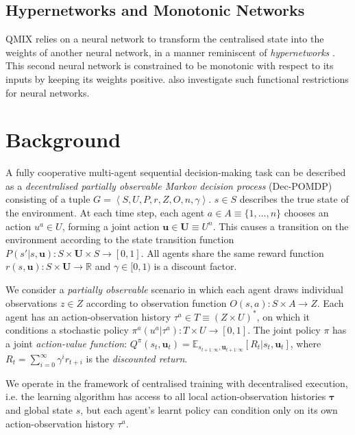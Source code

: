 \documentclass[twoside,11pt]{article}
\renewcommand{\cite}{\citep}
\begin{document}
\subsection{Hypernetworks and Monotonic Networks}
QMIX relies on a neural network to transform the centralised state into the weights of another neural network, in a manner reminiscent of 
\emph{hypernetworks} \citep{ha_hypernetworks_2016}. This second neural network 
is constrained to be monotonic with respect to its inputs by keeping its 
weights positive. \citet{Dugas_2009} also investigate such functional restrictions 
for neural networks.









 \section{Background}
\label{sec:background}


A fully cooperative multi-agent sequential decision-making task can be described as a \emph{decentralised partially observable Markov decision process} (Dec-POMDP) \cite{oliehoek_concise_2016} consisting of a tuple $G=\left\langle S,U,P,r,Z,O,n,\gamma\right\rangle$. 
$s \in S$ describes the true state of the environment.
At each time step, each agent $a \in A \equiv \{1,...,n\}$ chooses an action $u^a\in U$, forming a joint action $\mathbf{u}\in\mathbf{U}\equiv U^n$. 
This causes a transition on the environment according to the state transition function $P(s'|s,\mathbf{u}):S\times\mathbf{U}\times S\rightarrow [0,1]$. 
All agents share the same reward function $r(s,\mathbf{u}):S\times\mathbf{U}\rightarrow\mathbb{R}$ and $\gamma\in[0,1)$ is a discount factor. 

We consider a \textit{partially observable} scenario in which each agent draws individual observations $z\in Z$ according to observation function $O(s,a):S\times A\rightarrow Z$. 
Each agent has an action-observation history $\tau^a\in T\equiv(Z\times U)^*$, on which it conditions a stochastic policy $\pi^a(u^a|\tau^a):T\times U\rightarrow [0,1]$. The joint policy $\pi$ has a joint \textit{action-value function}: $Q^\pi(s_t, \mathbf{u}_t)=\mathbb{E}_{s_{t+1:\infty},\mathbf{u}_{t+1:\infty}} \left[R_t|s_t,\mathbf{u}_t\right]$, where $R_t=\sum^{\infty}_{i=0}\gamma^ir_{t+i}$ is the \textit{discounted return}.


We operate in the framework of centralised training with decentralised 
execution, i.e. the
learning algorithm has access to all local action-observation histories 
$\boldsymbol{\tau}$ and global state $s$, but each agent's learnt policy can 
condition only on its own action-observation history $\tau^a$.
\end{document}
